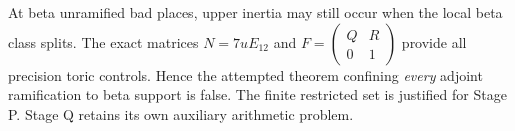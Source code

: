 At beta unramified bad places, upper inertia may still occur when the local beta class splits. The exact matrices $N=7uE_{12}$ and $F=\left(\begin{smallmatrix}Q&R\\0&1\end{smallmatrix}\right)$ provide all precision toric controls. Hence the attempted theorem confining \emph{every} adjoint ramification to beta support is false. The finite restricted set is justified for Stage P. Stage Q retains its own auxiliary arithmetic problem.
